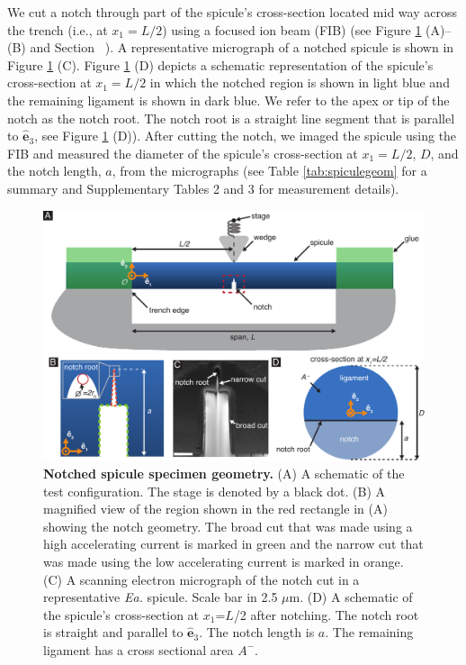 \documentclass[12pt,onecolumn]{article}
\makeatletter
\DeclareRobustCommand*{\nameref}[1]{%
      \emph{\myorg@nameref{#1}}%
    }%
\newcommand{\ez}{\hat{\mathbf{e}}_3}
\newcommand{\EA}{\textit{Ea.\@}\xspace}
\makeatother
\begin{document}
We cut a notch through part of the spicule's cross-section located mid way across the trench (i.e., at $x_1=L/2$) using a focused ion beam (FIB) (see Figure \ref{fig:notch} (A)--(B) and Section~\nameref{sec:notchconfig}). A representative micrograph of a notched spicule is shown in Figure \ref{fig:notch} (C). Figure \ref{fig:notch} (D) depicts a schematic representation of the spicule's cross-section at $x_1=L/2$ in which the notched region is shown in light blue and the remaining ligament is shown in dark blue. We refer to the apex or tip of the notch as the notch root. The notch root is a straight line segment that is parallel to $\ez$, see Figure \ref{fig:notch} (D)). After cutting the notch, we imaged the spicule using the FIB and measured the diameter of the spicule's cross-section at $x_1=L/2$, $D$, and the notch length, $a$, from the micrographs (see Table \ref{tab:spiculegeom} for a summary and Supplementary Tables 2 and 3 for measurement details). 
%
			\begin{figure}[hb!]
			\centering
			\includegraphics[width=\textwidth]{../Figures/FigureNotch/Figure3_V7.pdf}
			\caption{\textbf{Notched spicule specimen geometry.} (A) A schematic of the test configuration. The stage is denoted by a black dot. (B) A magnified view of the region shown in the red rectangle in (A) showing the notch geometry. The broad cut that was made using a high accelerating current is marked in green and the narrow cut that was made using the low accelerating current is marked in orange. (C) A scanning electron micrograph of the notch cut in a representative \EA spicule. Scale bar in 2.5 $\mu$m. (D) A schematic of the spicule's cross-section at $x_1$=$L$/2 after notching. The notch root is straight and parallel to $\ez$. The notch length is $a$. The remaining ligament has a cross sectional area $A^-$.}
			\label{fig:notch}
			\end{figure}
\end{document}
